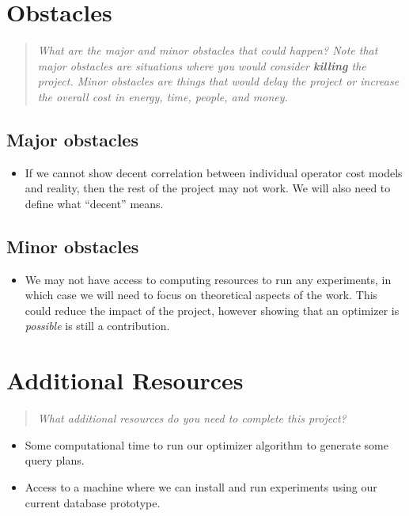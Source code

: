 \documentclass{proc}
\begin{document}
\section{Obstacles}
\begin{quote}
\emph{What are the major and minor obstacles that could happen? 
Note that major obstacles are situations where you would consider \textbf{killing} the project. 
Minor obstacles are things that would delay the project or increase the overall cost in energy, time, people, and money.}
\end{quote}

\subsection{Major obstacles} 

\begin{itemize}
  \item If we cannot show decent correlation between individual operator cost models and reality, then the rest of the project may not work.  We will also need to define what ``decent'' means.
\end{itemize}

\subsection{Minor obstacles}

\begin{itemize}
  \item We may not have access to computing resources to run any experiments, in which case we will need to focus on theoretical aspects of the work.  This could reduce the impact of the project, however showing that an optimizer is \emph{possible} is still a contribution.
\end{itemize}


\section{Additional Resources}
\begin{quote}
\emph{What additional resources do you need to complete this project?}
\end{quote}

\begin{itemize}
  \item Some computational time to run our optimizer algorithm to generate some query plans.
  \item Access to a machine where we can install and run experiments using our current database prototype.
 \end{itemize}
 
\end{document}
